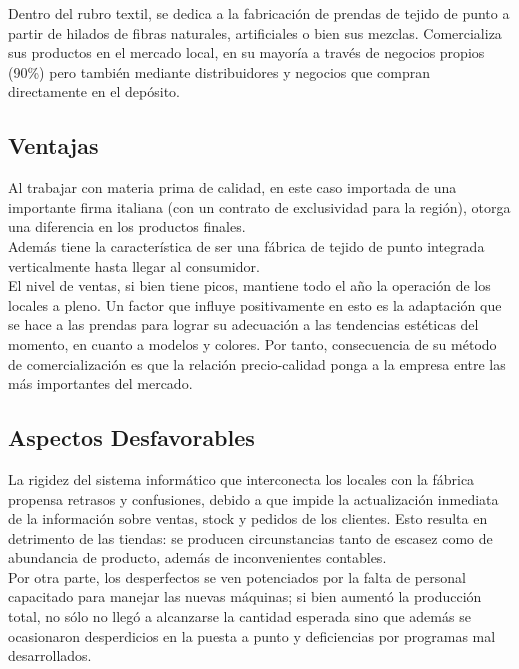 \documentclass[a4paper,12pt,titlepage]{article}
\begin{document}
	Dentro del rubro textil, se dedica a la fabricaci\'{o}n de prendas de tejido de punto a partir de hilados de fibras naturales, artificiales o bien sus mezclas.
Comercializa sus productos en el mercado local, en su mayor\'{i}a a trav\'{e}s de negocios propios (90\%) pero tambi\'{e}n mediante distribuidores y negocios que compran directamente en el dep\'{o}sito.

	\subsection {Ventajas}
	Al trabajar con materia prima de calidad, en este caso importada de una importante firma italiana (con un contrato de exclusividad para la regi\'{o}n), otorga una diferencia en los productos finales.\\
	
	Adem\'{a}s tiene la caracter\'{i}stica de ser una f\'{a}brica de tejido de punto integrada verticalmente hasta llegar al consumidor.\\
	
	El nivel de ventas, si bien tiene picos, mantiene todo el a\~no la operaci\'{o}n de los locales a pleno. Un factor que influye positivamente en esto es la adaptaci\'{o}n que se hace a las prendas para lograr su adecuaci\'{o}n a las tendencias est\'{e}ticas del momento, en cuanto a modelos y colores.
Por tanto, consecuencia de su m\'{e}todo de comercializaci\'{o}n es que la relaci\'{o}n precio-calidad ponga a la empresa entre las m\'{a}s importantes del mercado.

	\subsection {Aspectos Desfavorables}
	La rigidez del sistema inform\'{a}tico que interconecta los locales con la f\'{a}brica propensa retrasos y confusiones, debido a que impide la actualizaci\'{o}n inmediata de la informaci\'{o}n sobre ventas, stock y pedidos de los clientes. Esto resulta en detrimento de las tiendas: se producen circunstancias tanto de escasez como de abundancia de producto, adem\'{a}s de inconvenientes contables.\\
	
	Por otra parte, los desperfectos se ven potenciados por la falta de personal capacitado para manejar las nuevas m\'{a}quinas; si bien aument\'{o} la producci\'{o}n total, no s\'{o}lo no lleg\'{o} a alcanzarse la cantidad esperada sino que adem\'{a}s se ocasionaron desperdicios en la puesta a punto y deficiencias por programas mal desarrollados.
\end{document}
